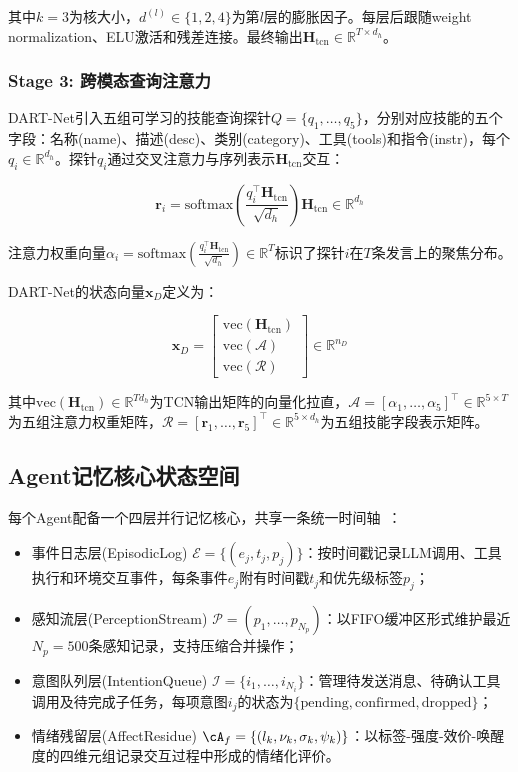 \documentclass[twocolumn,10.5pt]{ctexart}
\def\bmat#1{\begin{bmatrix}#1\end{bmatrix}}
\def\R{\mathbb{R}}
\def\cE{\mathcal{E}}
\def\cI{\mathcal{I}}
\def\cP{\mathcal{P}}
\begin{document}
其中$k=3$为核大小，$d^{(l)} \in \{1,2,4\}$为第$l$层的膨胀因子。每层后跟随weight normalization、ELU激活和残差连接。最终输出$\mathbf{H}_{\text{tcn}} \in \R^{T \times d_h}$。

\subsubsection{Stage 3: 跨模态查询注意力}

DART-Net引入五组可学习的技能查询探针$Q = \{q_1, \ldots, q_5\}$，分别对应技能的五个字段：名称(name)、描述(desc)、类别(category)、工具(tools)和指令(instr)，每个$q_i \in \R^{d_h}$。探针$q_i$通过交叉注意力与序列表示$\mathbf{H}_{\text{tcn}}$交互：

\begin{equation}
\mathbf{r}_i = \mathrm{softmax}\left(\frac{q_i^\top \mathbf{H}_{\text{tcn}}}{\sqrt{d_h}}\right) \mathbf{H}_{\text{tcn}} \in \R^{d_h}
\label{eq:cross_attn}
\end{equation}

注意力权重向量$\alpha_i = \mathrm{softmax}\left(\frac{q_i^\top \mathbf{H}_{\text{tcn}}}{\sqrt{d_h}}\right) \in \R^T$标识了探针$i$在$T$条发言上的聚焦分布。

DART-Net的状态向量$\mathbf{x}_D$定义为：

\begin{equation}
\mathbf{x}_D = \bmat{
\mathrm{vec}(\mathbf{H}_{\text{tcn}}) \\
\mathrm{vec}(\mathcal{A}) \\
\mathrm{vec}(\mathcal{R})
} \in \R^{n_D}
\label{eq:xd}
\end{equation}

其中$\mathrm{vec}(\mathbf{H}_{\text{tcn}}) \in \R^{T d_h}$为TCN输出矩阵的向量化拉直，$\mathcal{A} = [\alpha_1, \ldots, \alpha_5]^\top \in \R^{5 \times T}$为五组注意力权重矩阵，$\mathcal{R} = [\mathbf{r}_1, \ldots, \mathbf{r}_5]^\top \in \R^{5 \times d_h}$为五组技能字段表示矩阵。

\subsection{Agent记忆核心状态空间}

每个Agent配备一个四层并行记忆核心，共享一条统一时间轴~\cite{sumers2023coala}：

\begin{itemize}[nosep]
\item 事件日志层(EpisodicLog) $\cE = \{(e_j, t_j, p_j)\}$：按时间戳记录LLM调用、工具执行和环境交互事件，每条事件$e_j$附有时间戳$t_j$和优先级标签$p_j$；
\item 感知流层(PerceptionStream) $\cP = (p_1, \ldots, p_{N_p})$：以FIFO缓冲区形式维护最近$N_p = 500$条感知记录，支持压缩合并操作；
\item 意图队列层(IntentionQueue) $\cI = \{i_1, \ldots, i_{N_i}\}$：管理待发送消息、待确认工具调用及待完成子任务，每项意图$i_j$的状态为$\{\mathrm{pending}, \mathrm{confirmed}, \mathrm{dropped}\}$；
\item 情绪残留层(AffectResidue) $\cA_f = \{(l_k, \nu_k, \sigma_k, \psi_k)\}$：以标签-强度-效价-唤醒度的四维元组记录交互过程中形成的情绪化评价。
\end{itemize}
\end{document}
